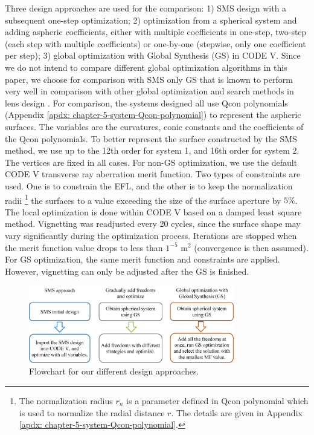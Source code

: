 Three design approaches are used for the comparison: 1) SMS design with a subsequent one-step optimization; 2) optimization from a spherical system and adding aspheric coefficients, either with multiple coefficients in one-step, two-step (each step with multiple coefficients) or one-by-one (stepwise, only one coefficient per step); 3) global optimization with Global Synthesis (GS) in CODE V. Since we do not intend to compare different global optimization algorithms in this paper, we choose for comparison with SMS only GS that is known to perform very well in comparison with other global optimization and search methods in lens design \cite{KuperGO1992}\cite{ShaferComPhy1994}. For comparison, the systems designed all use Qcon polynomials (Appendix \ref{apdx: chapter-5-system-Qcon-polynomial}) to represent the aspheric surfaces. The variables are the curvatures, conic constants and the coefficients of the Qcon polynomials. To better represent the surface constructed by the SMS method, we use up to the 12th order for system 1, and 16th order for system 2. The vertices are fixed in all cases. For non-GS optimization, we use the default CODE V transverse ray aberration merit function. Two types of constraints are used. One is to constrain the EFL, and the other is to keep the normalization radii \footnote{The normalization radius $r_n$ is a parameter defined in Qcon polynomial which is used to normalize the radial distance $r$. The details are given in Appendix \ref{apdx: chapter-5-system-Qcon-polynomial}.} the surfaces to a value exceeding the size of the surface aperture by $5\%$. The local optimization is done within CODE V based on a damped least square method. Vignetting was readjusted every 20 cycles, since the surface shape may vary significantly during the optimization process. Iterations are stopped when the merit function value drops to less than $1^{-5}$ \textmu m$^2$ (convergence is then assumed). For GS optimization, the same merit function and constraints are applied. However, vignetting can only be adjusted after the GS is finished. 

\begin{figure}[h!]
    \centering
    \includegraphics[width=0.8\textwidth]{chapter-5/figures/Fig3_flowchart.png}
    \caption{Flowchart for our different design approaches.}
    \label{fig: fig3_flowchart}
\end{figure}

